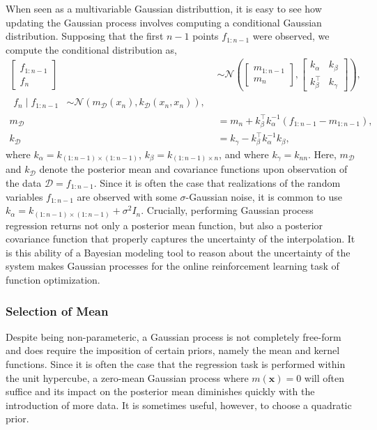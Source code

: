 \documentclass{article}
\newcommand{\x}{\mathbf{x}}
\newcommand{\D}{\mathcal{D}}
\newcommand{\N}[1]{\mathcal{N}\left(#1\right)}
\begin{document}
When seen as a multivariable Gaussian distributtion, it is easy to see how updating the Gaussian process involves computing a conditional Gaussian distribution. Supposing that the first $n-1$ points $f_{1:n-1}$ were observed, we compute the conditional distribution as,
\begin{align}
  \begin{bmatrix}
    f_{1:n-1} \\ f_n
  \end{bmatrix} &\sim
  \N{
    \begin{bmatrix} m_{1:n-1} \\  m_n \end{bmatrix},
    \begin{bmatrix}
      k_\alpha  & k_\beta \\
      k_\beta^\top  & k_\gamma
    \end{bmatrix}
  }, \\
  \begin{split}
    f_n \mid f_{1:n-1} &\sim
  \mathcal{N} (m_\D(x_n), k_\D(x_n, x_n)),
  \end{split}\\
  m_\D &= m_n + k_\beta^\top k_\alpha^{-1}(f_{1:n-1} - m_{1:n-1}), \\
  k_\D &= k_\gamma - k_\beta^\top k_\alpha^{-1} k_\beta,
\end{align}
where $k_\alpha = k_{(1:n-1) \times (1:n-1)}$, $k_\beta = k_{(1:n-1) \times n}$, and where $k_\gamma = k_{nn}$. Here, $m_\D$ and $k_\D$ denote the posterior mean and covariance functions upon observation of the data $\D = f_{1:n-1}$. Since it is often the case that realizations of the random variables $f_{1:n-1}$ are observed with some $\sigma$-Gaussian noise, it is common to use $k_\alpha = k_{(1:n-1) \times (1:n-1)} + \sigma^2I_n$. Crucially, performing Gaussian process regression returns not only a posterior mean function, but also a posterior covariance function that properly captures the uncertainty of the interpolation. It is this ability of a Bayesian modeling tool to reason about the uncertainty of the system makes Gaussian processes for the online reinforcement learning task of function optimization.

\subsubsection{Selection of Mean}
Despite being non-parameteric, a Gaussian process is not completely free-form and does require the imposition of certain priors, namely the mean and kernel functions. Since it is often the case that the regression task is performed within the unit hypercube, a zero-mean Gaussian process where $m(\x) = 0$ will often suffice and its impact on the posterior mean diminishes quickly with the introduction of more data. It is sometimes useful, however, to choose a quadratic prior.
\end{document}
